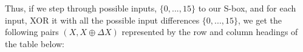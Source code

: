Thus, if we step through possible inputs, $\{0, ..., 15\}$ to our S-box, and for
each input, XOR it with all the possible input differences $\{0, ..., 15\}$, we
get the following pairs $(X, X \oplus \Delta X)$ represented by the row and
column headings of the table below:
\begin{comment}
\begin{center}
\begin{tabular}{|c|c|c|c|c|c|c|c|c|}
\hline
& 000 & 001 & 010 & 011 & 100 & 101 & 110 & 111 \\\hline
001 & & & & & & & & \\\hline
010 & & & & & & & & \\\hline
011 & & & & & & & & \\\hline
100 & & & & & & & & \\\hline
101 & & & & & & & & \\\hline
110 & & & & & & & & \\\hline
111 & & & & & & & & \\\hline
\end{tabular}
\end{center}
\end{comment}
